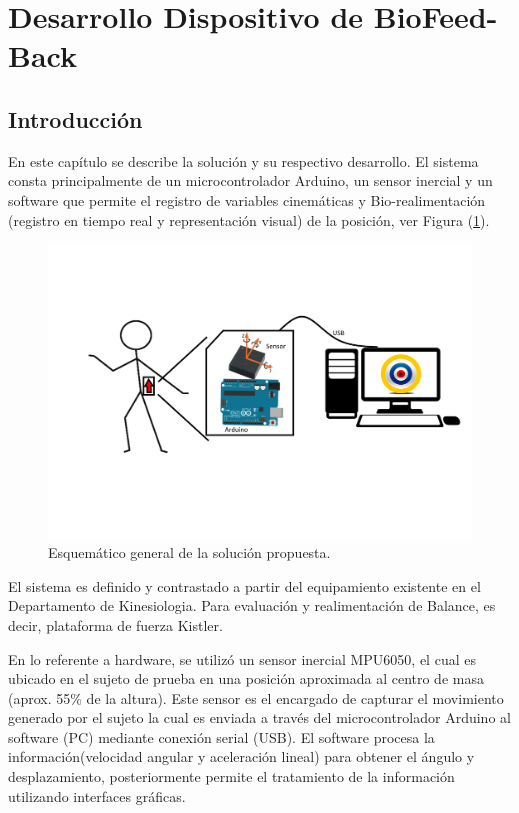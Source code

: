 \documentclass[12pt,a4paper]{article}
\newcommand{\nombreDispositivo}{Dispositivo de BioFeed-Back }
\begin{document}
\section{Desarrollo \nombreDispositivo}
\subsection{Introducción}
En este capítulo se describe la solución y su respectivo desarrollo.
El sistema consta principalmente de un microcontrolador Arduino, un sensor inercial y un software que permite el registro de variables cinemáticas y Bio-realimentación (registro en tiempo real y representación visual) de la posición, ver Figura (\ref{fig:diagramasistema}).

\begin{figure}[H]
	\centering
	\includegraphics[scale=0.25]{images/diagrama_sistema}
	\caption{Esquemático general de la solución propuesta.}
	\label{fig:diagramasistema}
\end{figure}

El sistema es definido y contrastado a partir del equipamiento existente en el Departamento de Kinesiologia. Para evaluación y realimentación de Balance, es decir, plataforma de fuerza Kistler.

En lo referente a hardware, se utilizó un sensor inercial MPU6050, el cual es ubicado en el sujeto de prueba en una posición aproximada al centro de masa (aprox. 55\% de la altura). Este sensor es el encargado de capturar el movimiento generado por el sujeto la cual es  enviada a través del microcontrolador Arduino al software (PC) mediante conexión serial (USB). El software procesa la información(velocidad angular y aceleración lineal) para obtener el ángulo y desplazamiento, posteriormente permite el tratamiento de la información utilizando interfaces gráficas.
\end{document}

